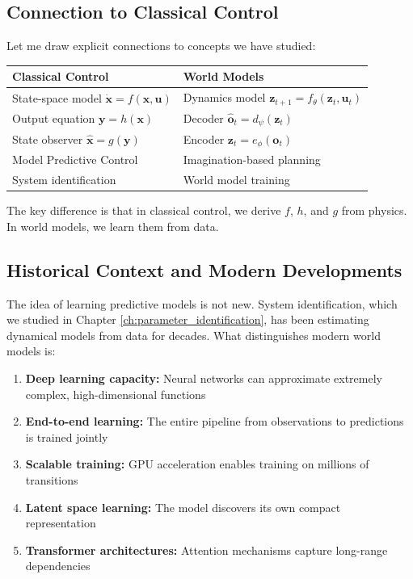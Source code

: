 \subsection{Connection to Classical Control}

Let me draw explicit connections to concepts we have studied:

\begin{center}
\begin{tabular}{ll}
\toprule
\textbf{Classical Control} & \textbf{World Models} \\
\midrule
State-space model $\dot{\mathbf{x}} = f(\mathbf{x}, \mathbf{u})$ & Dynamics model $\mathbf{z}_{t+1} = f_\theta(\mathbf{z}_t, \mathbf{u}_t)$ \\
Output equation $\mathbf{y} = h(\mathbf{x})$ & Decoder $\hat{\mathbf{o}}_t = d_\psi(\mathbf{z}_t)$ \\
State observer $\hat{\mathbf{x}} = g(\mathbf{y})$ & Encoder $\mathbf{z}_t = e_\phi(\mathbf{o}_t)$ \\
Model Predictive Control & Imagination-based planning \\
System identification & World model training \\
\bottomrule
\end{tabular}
\end{center}

The key difference is that in classical control, we derive $f$, $h$, and $g$ from physics. In world models, we learn them from data.

\subsection{Historical Context and Modern Developments}

The idea of learning predictive models is not new. System identification, which we studied in Chapter \ref{ch:parameter_identification}, has been estimating dynamical models from data for decades. What distinguishes modern world models is:

\begin{enumerate}
    \item \textbf{Deep learning capacity:} Neural networks can approximate extremely complex, high-dimensional functions
    \item \textbf{End-to-end learning:} The entire pipeline from observations to predictions is trained jointly
    \item \textbf{Scalable training:} GPU acceleration enables training on millions of transitions
    \item \textbf{Latent space learning:} The model discovers its own compact representation
    \item \textbf{Transformer architectures:} Attention mechanisms capture long-range dependencies
\end{enumerate}

